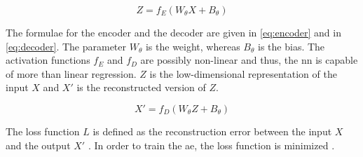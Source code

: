 \begin{equation}
    Z = f_E(W_\theta X + B_\theta)
    \label{eq:encoder}
\end{equation}

The formulae for the encoder and the decoder are given in \autoref{eq:encoder} and in \autoref{eq:decoder}.
The parameter $W_\theta$ is the weight, whereas $B_\theta$ is the bias.
The activation functions $f_E$ and $f_D$ are possibly non-linear and thus, the \ac{nn} is capable of more than linear regression.
$Z$ is the low-dimensional representation of the input $X$ and $X'$ is the reconstructed version of $Z$.

\begin{equation}
    X' = f_D(W_\theta Z + B_\theta)
    \label{eq:decoder}
\end{equation}

The loss function $L$ is defined as the reconstruction error between the input $X$ and the output $X'$ \cite{seminar_ies}.
In order to train the \ac{ae}, the loss function is minimized \cite{autoencoder2021}.


